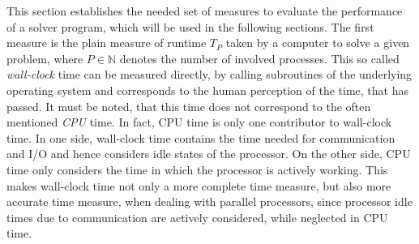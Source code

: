 This section establishes the needed set of measures to evaluate the performance of a solver program, which will be used in the following sections. The first measure is the plain measure of runtime \(T_P\) taken by a computer to solve a given problem, where \(P \in \mathbb{N}\) denotes the number of involved processes. This so called \emph{wall-clock} time can be measured directly, by calling subroutines of the underlying operating system and corresponds to the human perception of the time, that has passed. It must be noted, that this time does not correspond to the often mentioned \emph{CPU} time. In fact, CPU time is only one contributor to wall-clock time. In one side, wall-clock time contains the time needed for communication and I/O and hence considers idle states of the processor. On the other side, CPU time only considers the time in which the processor is actively working. This makes wall-clock time not only a more complete time measure, but also more accurate time measure, when dealing with parallel processors, since processor idle times due to communication are actively considered, while neglected in CPU time.

